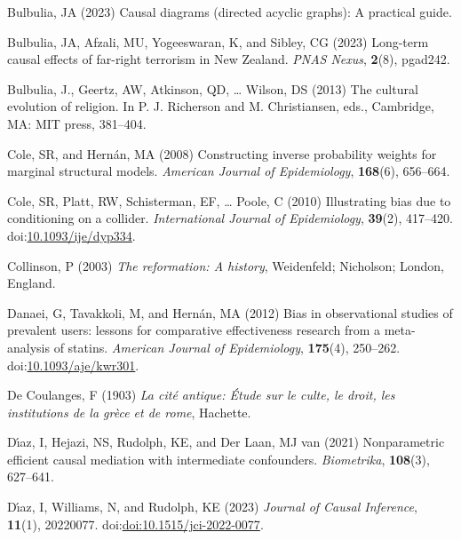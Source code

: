 \documentclass[
  single column]{article}
\newlength{\cslhangindent}
\newenvironment{CSLReferences}[2] %
 {\begin{list}{}{%
  \setlength{\itemindent}{0pt}
  \setlength{\leftmargin}{0pt}
  \setlength{\parsep}{0pt}
  \ifodd #1
   \setlength{\leftmargin}{\cslhangindent}
   \setlength{\itemindent}{-1\cslhangindent}
  \fi
  \setlength{\itemsep}{#2\baselineskip}}}
 {\end{list}}
\begin{document}
\begin{CSLReferences}{1}{0}
Bulbulia, JA (2023) Causal diagrams (directed acyclic graphs): A
practical guide.

Bulbulia, JA, Afzali, MU, Yogeeswaran, K, and Sibley, CG (2023)
Long-term causal effects of far-right terrorism in {N}ew {Z}ealand.
\emph{PNAS Nexus}, \textbf{2}(8), pgad242.

Bulbulia, J., Geertz, AW, Atkinson, QD, \ldots{} Wilson, DS (2013) The
cultural evolution of religion. In P. J. Richerson and M. Christiansen,
eds., Cambridge, MA: MIT press, 381--404.

Cole, SR, and Hernán, MA (2008) Constructing inverse probability weights
for marginal structural models. \emph{American Journal of Epidemiology},
\textbf{168}(6), 656--664.

Cole, SR, Platt, RW, Schisterman, EF, \ldots{} Poole, C (2010)
Illustrating bias due to conditioning on a collider. \emph{International
Journal of Epidemiology}, \textbf{39}(2), 417--420.
doi:\href{https://doi.org/10.1093/ije/dyp334}{10.1093/ije/dyp334}.

Collinson, P (2003) \emph{The reformation: A history}, Weidenfeld;
Nicholson; London, England.

Danaei, G, Tavakkoli, M, and Hernán, MA (2012) Bias in observational
studies of prevalent users: lessons for comparative effectiveness
research from a meta-analysis of statins. \emph{American Journal of
Epidemiology}, \textbf{175}(4), 250--262.
doi:\href{https://doi.org/10.1093/aje/kwr301}{10.1093/aje/kwr301}.

De Coulanges, F (1903) \emph{La cité antique: Étude sur le culte, le
droit, les institutions de la grèce et de rome}, Hachette.

Dı́az, I, Hejazi, NS, Rudolph, KE, and Der Laan, MJ van (2021)
Nonparametric efficient causal mediation with intermediate confounders.
\emph{Biometrika}, \textbf{108}(3), 627--641.

Dı́az, I, Williams, N, and Rudolph, KE (2023) \emph{Journal of Causal
Inference}, \textbf{11}(1), 20220077.
doi:\href{https://doi.org/doi:10.1515/jci-2022-0077}{doi:10.1515/jci-2022-0077}.


\end{CSLReferences}
\end{document}

